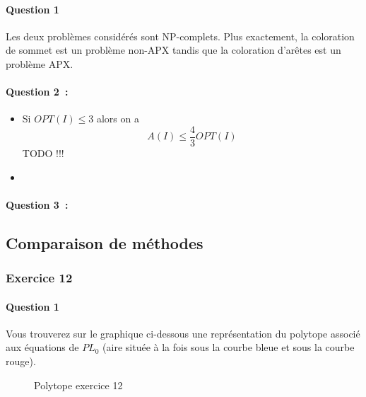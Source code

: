 \documentclass[a4paper, 12pt]{article}
\begin{document}
\paragraph{Question 1}

Les deux problèmes considérés sont NP-complets. Plus exactement, la
coloration de sommet est un problème non-APX tandis que la coloration
d'arêtes est un problème APX. 

\paragraph{Question 2~:}
\begin{itemize}
\item Si $OPT(I) \leq 3$ alors on a
\begin{equation}
A(I) \leq \frac{4}{3}OPT(I) 
\end{equation}
TODO !!!
\item
\end{itemize}

\paragraph{Question 3~:}

\subsection{Comparaison de méthodes}

\subsubsection*{Exercice 12}

\paragraph{Question 1}

Vous trouverez sur le graphique ci-dessous une représentation du
polytope associé aux équations de $PL_0$ (aire située à la fois sous la courbe
bleue et sous la courbe rouge).

\begin{figure}[h!]
\centering
{}
\caption{Polytope exercice 12}
\end{figure}
\end{document}
